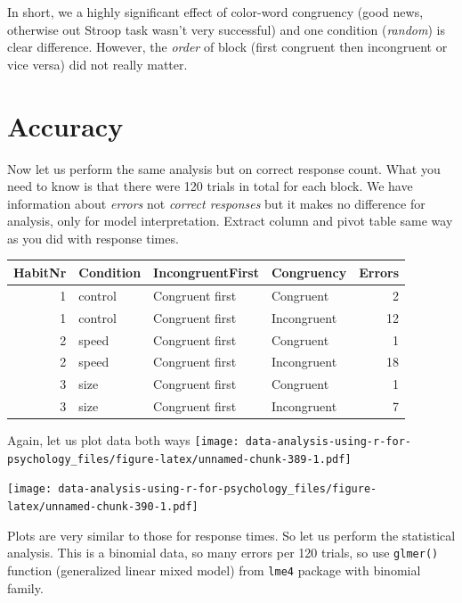 \documentclass[
]{book}
\begin{document}
In short, we a highly significant effect of color-word congruency (good news, otherwise out Stroop task wasn't very successful) and one condition (\emph{random}) is clear difference. However, the \emph{order} of block (first congruent then incongruent or vice versa) did not really matter.

\hypertarget{accuracy}{%
\section{Accuracy}\label{accuracy}}

Now let us perform the same analysis but on correct response count. What you need to know is that there were 120 trials in total for each block. We have information about \emph{errors} not \emph{correct responses} but it makes no difference for analysis, only for model interpretation. Extract column and pivot table same way as you did with response times.

\begin{tabular}{r|l|l|l|r}
\hline
HabitNr & Condition & IncongruentFirst & Congruency & Errors\\
\hline
1 & control & Congruent first & Congruent & 2\\
\hline
1 & control & Congruent first & Incongruent & 12\\
\hline
2 & speed & Congruent first & Congruent & 1\\
\hline
2 & speed & Congruent first & Incongruent & 18\\
\hline
3 & size & Congruent first & Congruent & 1\\
\hline
3 & size & Congruent first & Incongruent & 7\\
\hline
\end{tabular}

Again, let us plot data both ways
\texttt{[image: data-analysis-using-r-for-psychology\_files/figure-latex/unnamed-chunk-389-1.pdf]}

\texttt{[image: data-analysis-using-r-for-psychology\_files/figure-latex/unnamed-chunk-390-1.pdf]}

Plots are very similar to those for response times. So let us perform the statistical analysis. This is a binomial data, so many errors per 120 trials, so use \texttt{glmer()} function (generalized linear mixed model) from \texttt{lme4} package with binomial family.
\end{document}
